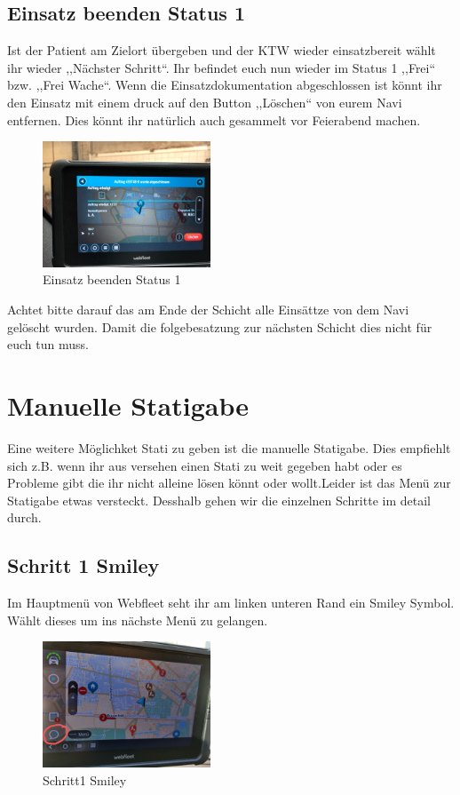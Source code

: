 \documentclass[a4paper,12pt]{scrartcl}
\begin{document}
    \subsection{Einsatz beenden Status 1}
    Ist der Patient am Zielort übergeben und der KTW wieder einsatzbereit wählt ihr wieder ,,Nächster Schritt``.
    Ihr befindet euch nun wieder im Status 1 ,,Frei`` bzw. ,,Frei Wache``. Wenn die Einsatzdokumentation abgeschlossen ist 
    könnt ihr den Einsatz mit einem druck auf den Button ,,Löschen`` von eurem Navi entfernen. Dies könnt ihr natürlich 
    auch gesammelt vor Feierabend machen. 
    \begin{figure}[h]
        \begin{center}
            \includegraphics[width=5cm]{bilder/beenden.jpg}
            \caption{Einsatz beenden Status 1}
            \label{Beenden}
        \end{center} 
    \end{figure}
    \newline Achtet bitte darauf das am Ende der Schicht alle Einsättze von dem Navi gelöscht wurden. Damit die folgebesatzung
    zur nächsten Schicht dies nicht für euch tun muss.

    \newpage
    \section{Manuelle Statigabe}
    Eine weitere Möglichket Stati zu geben ist die manuelle Statigabe. Dies empfiehlt sich z.B. wenn ihr
    aus versehen einen Stati zu weit gegeben habt oder es Probleme gibt die ihr nicht alleine lösen 
    könnt oder wollt.Leider ist das Menü zur Statigabe etwas versteckt.
    Desshalb gehen wir die einzelnen Schritte im detail durch.
    

    \subsection{Schritt 1 Smiley}
    Im Hauptmenü von Webfleet seht ihr am linken unteren Rand ein Smiley Symbol. Wählt dieses um ins nächste
    Menü zu gelangen.
    \begin{figure}[h]
        \begin{center}
            \includegraphics[width=5cm]{bilder/Schritt1.jpg}
            \caption{Schritt1 Smiley}
            \label{Smiley}
        \end{center} 
    \end{figure}
\end{document}
